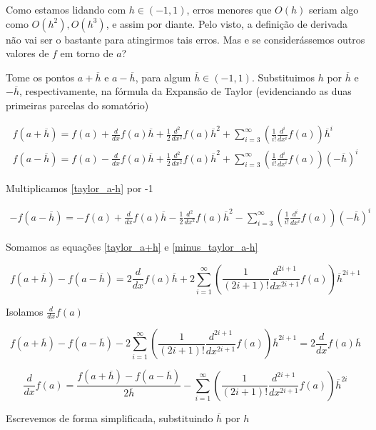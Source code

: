 \documentclass[]{article}
\numberwithin{equation}{section}
\begin{document}
Como estamos lidando com $h \in (-1, 1)$, erros menores que $O(h)$ seriam algo como $O(h^2), O(h^3)$, e assim por diante. Pelo visto, a definição de derivada não vai ser o bastante para atingirmos tais erros. Mas e se considerássemos outros valores de $f$ em torno de $a$?

Tome os pontos $a + \overline{h}$ e $a - \overline{h}$, para algum $\overline{h} \in (-1, 1)$. Substituimos $h$ por $\overline{h}$ e $-\overline{h}$, respectivamente, na fórmula da Expansão de Taylor (evidenciando as duas primeiras parcelas do somatório)

\begin{align}
f(a + \overline{h}) = f(a) + \frac{d}{dx} f(a)\overline{h} + \frac{1}{2} \frac{d^2}{dx^2} f(a) \overline{h}^2 + \sum_{i = 3}^{\infty} \left(\frac{1}{i!} \frac{d^i}{dx^i} f(a)\right) \overline{h}^i \label{taylor_a+h} \\
f(a - \overline{h}) = f(a) - \frac{d}{dx} f(a)\overline{h} + \frac{1}{2} \frac{d^2}{dx^2} f(a) \overline{h}^2 + \sum_{i = 3}^{\infty} \left(\frac{1}{i!} \frac{d^i}{dx^i} f(a)\right) (-\overline{h})^i \label{taylor_a-h}
\end{align}

Multiplicamos \eqref{taylor_a-h} por -1

\begin{align}
- f(a - \overline{h}) = - f(a) + \frac{d}{dx} f(a)\overline{h} - \frac{1}{2} \frac{d^2}{dx^2} f(a) \overline{h}^2 - \sum_{i = 3}^{\infty} \left(\frac{1}{i!} \frac{d^i}{dx^i} f(a)\right) (-\overline{h})^i \label{minus_taylor_a-h}
\end{align}

Somamos as equações \eqref{taylor_a+h} e \eqref{minus_taylor_a-h}

$$
f(a + \overline{h}) - f(a - \overline{h}) = 2 \frac{d}{dx} f(a)\overline{h} + 2 \sum_{i = 1}^{\infty} \left(\frac{1}{(2i + 1)!} \frac{d^{2i + 1}}{dx^{2i + 1}} f(a)\right) \overline{h}^{2i + 1}
$$

Isolamos $\frac{d}{dx} f(a)$

$$
f(a + \overline{h}) - f(a - \overline{h}) - 2 \sum_{i = 1}^{\infty} \left(\frac{1}{(2i + 1)!} \frac{d^{2i + 1}}{dx^{2i + 1}} f(a)\right) \overline{h}^{2i + 1} = 2 \frac{d}{dx} f(a)\overline{h}
$$

$$
\frac{d}{dx} f(a) = \frac{f(a + \overline{h}) - f(a - \overline{h})}{2 \overline{h}} - \sum_{i = 1}^{\infty} \left(\frac{1}{(2i + 1)!} \frac{d^{2i + 1}}{dx^{2i + 1}} f(a)\right) \overline{h}^{2i}
$$

Escrevemos de forma simplificada, substituindo $\overline{h}$ por $h$
\end{document}

